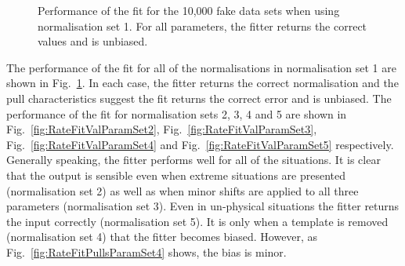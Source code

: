 \begin{figure}%
  \centering
  \caption{Performance of the fit for the 10,000 fake data sets when using normalisation set 1.  For all parameters, the fitter returns the correct values and is unbiased.}
  \label{fig:RateFitValParamSet1}
\end{figure}
The performance of the fit for all of the normalisations in normalisation set 1 are shown in Fig.~\ref{fig:RateFitValParamSet1}.  In each case, the fitter returns the correct normalisation and the pull characteristics suggest the fit returns the correct error and is unbiased.  The performance of the fit for normalisation sets 2, 3, 4 and 5 are shown in Fig.~\ref{fig:RateFitValParamSet2}, Fig.~\ref{fig:RateFitValParamSet3}, Fig.~\ref{fig:RateFitValParamSet4} and Fig.~\ref{fig:RateFitValParamSet5} respectively.  Generally speaking, the fitter performs well for all of the situations.  It is clear that the output is sensible even when extreme situations are presented (normalisation set 2) as well as when minor shifts are applied to all three parameters (normalisation set 3).  Even in un-physical situations the fitter returns the input correctly (normalisation set 5).  It is only when a template is removed (normalisation set 4) that the fitter becomes biased.  However, as Fig.~\ref{fig:RateFitPullsParamSet4} shows, the bias is minor.
